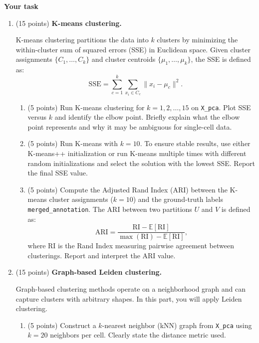 \vspace{20pt}

\textbf{Your task}

\begin{enumerate}

\item (15 points) \textbf{K-means clustering.}

K-means clustering partitions the data into $k$ clusters by minimizing the within-cluster sum of squared errors (SSE) in Euclidean space. Given cluster assignments $\{C_1, \dots, C_k\}$ and cluster centroids $\{\mu_1, \dots, \mu_k\}$, the SSE is defined as:
\[
\mathrm{SSE} = \sum_{c=1}^{k} \sum_{x_i \in C_c} \lVert x_i - \mu_c \rVert^2 .
\]

\begin{enumerate}
    \item (5 points) Run K-means clustering for $k = 1,2,\dots,15$ on \texttt{X\_pca}. Plot SSE versus $k$ and identify the elbow point. Briefly explain what the elbow point represents and why it may be ambiguous for single-cell data.
    
    \item (5 points) Run K-means with $k=10$. To ensure stable results, use either K-means++ initialization or run K-means multiple times with different random initializations and select the solution with the lowest SSE. Report the final SSE value.
    
    \item (5 points) Compute the Adjusted Rand Index (ARI) between the K-means cluster assignments ($k=10$) and the ground-truth labels \texttt{merged\_annotation}. The ARI between two partitions $U$ and $V$ is defined as:
    \[
    \mathrm{ARI} = \frac{\mathrm{RI} - \mathbb{E}[\mathrm{RI}]}{\max(\mathrm{RI}) - \mathbb{E}[\mathrm{RI}]},
    \]
    where RI is the Rand Index measuring pairwise agreement between clusterings. Report and interpret the ARI value.
\end{enumerate}


\vspace{20pt}

\item (15 points) \textbf{Graph-based Leiden clustering.}

Graph-based clustering methods operate on a neighborhood graph and can capture clusters with arbitrary shapes. In this part, you will apply Leiden clustering.

\begin{enumerate}
    \item (5 points) Construct a $k$-nearest neighbor (kNN) graph from \texttt{X\_pca} using $k=20$ neighbors per cell. Clearly state the distance metric used.
    

\end{enumerate}
\end{enumerate}
